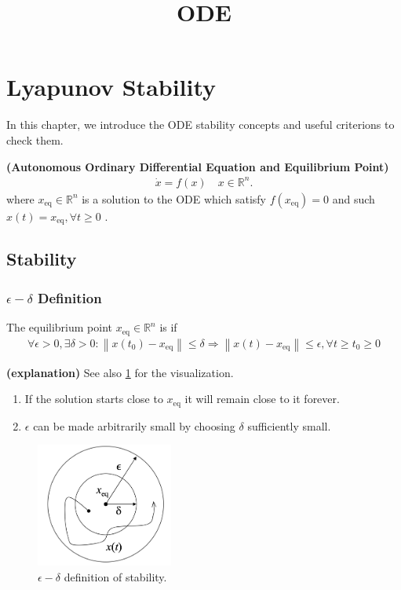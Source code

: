 \documentclass{article}
\title{ODE}
\newcommand{\bfs}[1]{\textbf{({#1}) }}
\begin{document}
\maketitle

\section{Lyapunov Stability}

In this chapter, we introduce the ODE stability concepts and useful criterions to check them.
\begin{defa}\bfs{Autonomous Ordinary Differential Equation and Equilibrium Point}
\begin{align}
    \dot{x}=f(x) \quad x \in \mathbb{R}^{n}.\label{eq:ode}
\end{align}
where  $x_{\mathrm{eq}} \in \mathbb{R}^{n}$ is a solution to the ODE which satisfy $f\left(x_{\mathrm{eq}}\right)=0$ and  such $x(t)=x_{\mathrm{eq}}, \forall t \geq 0$ .
\end{defa}
\subsection{Stability}
\subsubsection{$\epsilon-\delta$ Definition}

\begin{defa}
The equilibrium point $x_{\mathrm{eq}} \in \mathbb{R}^{n}$ is if
\begin{align*}
\forall \epsilon>0, \exists \delta>0:\left\|x\left(t_{0}\right)-x_{\mathrm{eq}}\right\| \leq \delta \Longrightarrow\left\|x(t)-x_{\mathrm{eq}}\right\| \leq \epsilon, \forall t \geq t_{0} \geq 0
\end{align*}
\end{defa}
\begin{rema}\bfs{explanation} See also \cref{fig:stabepsilon_delta} for the visualization.
\begin{enumerate}
    \item If the solution starts close to $x_{\mathrm {eq}}$ it will remain close to it forever.
    \item $\epsilon$ can be made arbitrarily small by choosing $\delta$ sufficiently small.
\end{enumerate}
\end{rema}
\begin{figure}[H]
    \centering
    \includegraphics[width=0.4\textwidth]{Figs/1.png}
    \caption{$\epsilon-\delta$ definition of stability.}
    \label{fig:stabepsilon_delta}
\end{figure}
\end{document}
